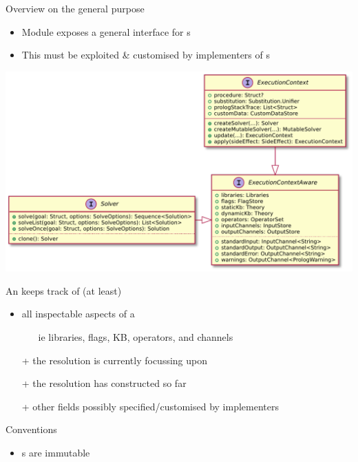 \documentclass[handout]{beamer}
\begin{document}
\begin{frame}[allowframebreaks]{Overview on the general purpose }
    \begin{itemize}
        \item Module  exposes a general interface for s
        \item This must be exploited \& customised by implementers of s
    \end{itemize}
    \begin{center}
        \includegraphics[width=.6\linewidth]{img/solve-ec.pdf}
    \end{center}

    \framebreak

    \begin{block}{An  keeps track of (at least)}
        \begin{itemize}
            \item all inspectable aspects of a 
            \begin{itemize}
                \item[ie] libraries, flags, KB, operators, and channels
            \end{itemize}
            \item[+] the \alert{} resolution is currently focussing upon
            \item[+] the \alert{} resolution has constructed so far
            \item[+] other fields possibly specified/customised by implementers
        \end{itemize}
    \end{block}

    \framebreak

    \begin{alertblock}{Conventions}
        \begin{itemize}
            \item {}s are \alert{immutable}


\end{itemize}
\end{alertblock}
\end{frame}
\end{document}
